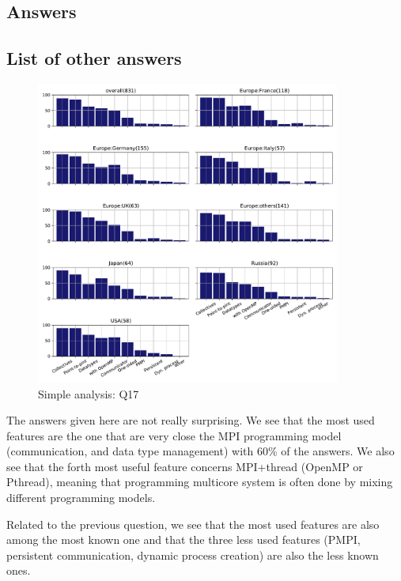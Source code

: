 
\subsection{Answers}


\subsection{List of other answers}
\begin{itemize}

\end{itemize}

\begin{figure}[htb]
\begin{center}
\includegraphics[width=10cm]{../pdfs/Q17.pdf}
\caption{Simple analysis: Q17}
\label{fig:Q17}
\end{center}
\end{figure}

The answers given here are not really surprising. We see that the most used
features are the one that are very close the MPI programming model
(communication, and data type management) with 60\% of the answers. We also see
that the forth most useful feature concerns MPI+thread (OpenMP or Pthread),
meaning that programming multicore system is often done by mixing different
programming models.  

Related to the previous question, we see that the most used features are also
among the most known one and that the three less used features (PMPI, persistent
communication, dynamic process creation) are also the less known ones. 
